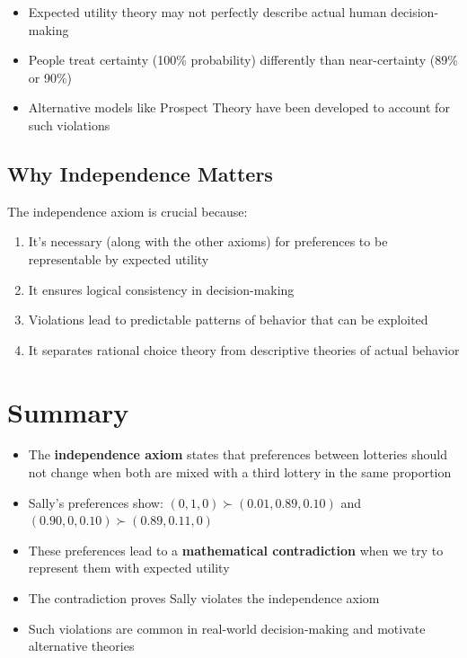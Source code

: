 \documentclass[12pt]{article}
\begin{document}
\begin{itemize}
    \item Expected utility theory may not perfectly describe actual human decision-making
    \item People treat certainty (100\% probability) differently than near-certainty (89\% or 90\%)
    \item Alternative models like Prospect Theory have been developed to account for such violations
\end{itemize}

\subsection{Why Independence Matters}

The independence axiom is crucial because:
\begin{enumerate}
    \item It's necessary (along with the other axioms) for preferences to be representable by expected utility
    \item It ensures logical consistency in decision-making
    \item Violations lead to predictable patterns of behavior that can be exploited
    \item It separates rational choice theory from descriptive theories of actual behavior
\end{enumerate}

\section{Summary}

\begin{itemize}
    \item The \textbf{independence axiom} states that preferences between lotteries should not change when both are mixed with a third lottery in the same proportion
    \item Sally's preferences show: $(0, 1, 0) \succ (0.01, 0.89, 0.10)$ and $(0.90, 0, 0.10) \succ (0.89, 0.11, 0)$
    \item These preferences lead to a \textbf{mathematical contradiction} when we try to represent them with expected utility
    \item The contradiction proves Sally violates the independence axiom
    \item Such violations are common in real-world decision-making and motivate alternative theories
\end{itemize}
\end{document}

